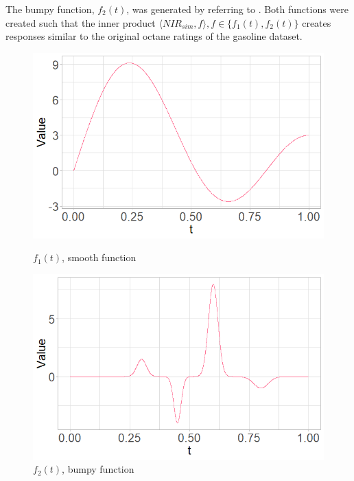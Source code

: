 \documentclass[11pt,twoside,a4paper]{article}
\begin{document}
    The bumpy function, $f_2(t)$, was generated by referring to \cite{cardot_bumpyfunction_2002}. 
    Both functions were created such that the inner product $\langle NIR_{sim}, f \rangle, f \in \{f_1(t), f_2(t)\}$ creates responses similar to the original octane ratings of the gasoline dataset. 

		\vspace{0.1cm}
		\begin{figure}
			\centering
			\begin{minipage}{.5\textwidth}
				\centering
  				\includegraphics[width=\textwidth]{../Graphics/smooth_function.png}
  				\caption{$f_1(t)$, smooth function}
  				\label{fig:test1}
			\end{minipage}%
			\begin{minipage}{.5\textwidth}
	  			\centering
  				\includegraphics[width=\textwidth]{../Graphics/bumpy_function.png}
  				\caption{$f_2(t)$, bumpy function}
  				\label{fig:test2}
			\end{minipage}
		\end{figure}
		
\end{document}
